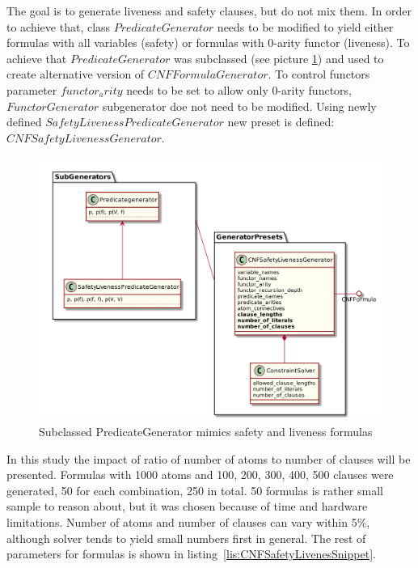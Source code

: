 The goal is to generate liveness and safety clauses, but do not mix them. In order to achieve that, class $PredicateGenerator$ needs to be modified to yield either formulas with all variables (safety) or formulas with 0-arity functor (liveness). To achieve that $PredicateGenerator$ was subclassed (see picture \ref{pic:SafetyLivenessGeneratorPreset}) and used to create alternative version of $CNFFormulaGenerator$. To control functors parameter $functor_arity$ needs to be set to allow only 0-arity functors, $FunctorGenerator$ subgenerator doe not need to be modified. Using newly defined $SafetyLivenessPredicateGenerator$ new preset is defined: $CNFSafetyLivenessGenerator$.

\begin{figure}[h]
\begin{centering}
  \includegraphics[width=\textwidth]{logic-formula-generator/fol/safety_liveness_predicate_generator.png}
  \caption{Subclassed PredicateGenerator mimics safety and liveness formulas}
  \label{pic:SafetyLivenessGeneratorPreset}
\end{centering}
\end{figure}

In this study the impact of ratio of number of atoms to number of clauses will be presented.
Formulas with 1000 atoms and 100, 200, 300, 400, 500 clauses were generated, 50 for each combination, 250 in total. 50 formulas is rather small sample to reason about, but it was chosen because of time and hardware limitations. Number of atoms and number of clauses can vary within 5\%, although solver tends to yield small numbers first in general. The rest of parameters for formulas is shown in listing~\ref{lis:CNFSafetyLivenesSnippet}.


